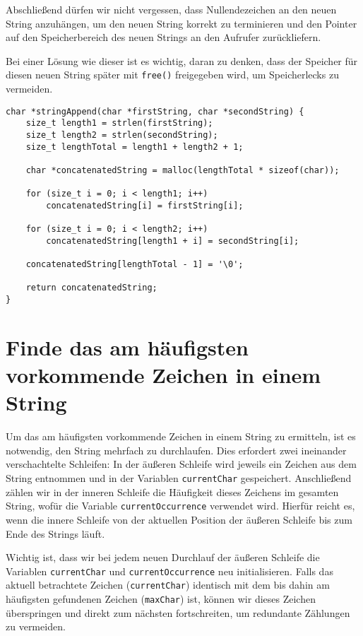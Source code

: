 Abschließend dürfen wir nicht vergessen, dass Nullendezeichen an den neuen
String anzuhängen, um den neuen String korrekt zu terminieren und den Pointer
auf den Speicherbereich des neuen Strings an den Aufrufer zurückliefern.

Bei einer Lösung wie dieser ist es wichtig, daran zu denken, dass der Speicher
für diesen neuen String später mit \texttt{free()} freigegeben wird, um
Speicherlecks zu vermeiden.

\begin{verbatim}
char *stringAppend(char *firstString, char *secondString) {
    size_t length1 = strlen(firstString);
    size_t length2 = strlen(secondString);
    size_t lengthTotal = length1 + length2 + 1;

    char *concatenatedString = malloc(lengthTotal * sizeof(char));

    for (size_t i = 0; i < length1; i++)
        concatenatedString[i] = firstString[i];

    for (size_t i = 0; i < length2; i++)
        concatenatedString[length1 + i] = secondString[i];

    concatenatedString[lengthTotal - 1] = '\0';

    return concatenatedString;
}
\end{verbatim}





\chapter{Finde das am häufigsten vorkommende Zeichen in einem String}

Um das am häufigsten vorkommende Zeichen in einem String zu ermitteln, ist es
notwendig, den String mehrfach zu durchlaufen. Dies erfordert zwei ineinander
verschachtelte Schleifen: In der äußeren Schleife wird jeweils ein Zeichen aus
dem String entnommen und in der Variablen \texttt{currentChar}
gespeichert. Anschließend zählen wir in der inneren Schleife die Häufigkeit
dieses Zeichens im gesamten String, wofür die Variable
\texttt{currentOccurrence} verwendet wird. Hierfür reicht es, wenn die
innere Schleife von der aktuellen Position der äußeren Schleife bis zum Ende des
Strings läuft.

Wichtig ist, dass wir bei jedem neuen Durchlauf der äußeren Schleife die
Variablen \texttt{currentChar} und \texttt{currentOccurrence} neu
initialisieren. Falls das aktuell betrachtete Zeichen
(\texttt{currentChar}) identisch mit dem bis dahin am häufigsten
gefundenen Zeichen (\texttt{maxChar}) ist, können wir dieses Zeichen
überspringen und direkt zum nächsten fortschreiten, um redundante Zählungen zu
vermeiden.

